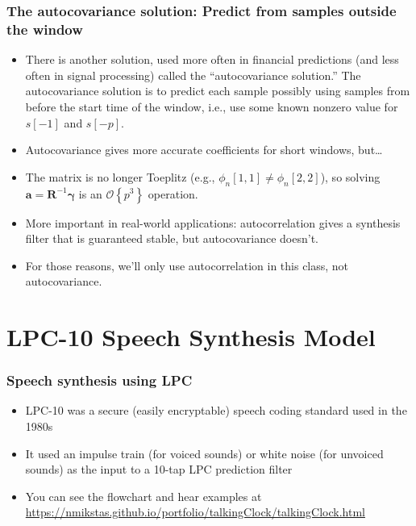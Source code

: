 \documentclass{beamer}
\begin{document}
\begin{frame}
  \frametitle{The autocovariance solution: Predict from samples outside the window}

  \begin{itemize}
  \item  There is another solution, used more often in financial predictions (and less
    often in signal processing) called the ``autocovariance solution.'' 
    The autocovariance solution is to predict each sample possibly using
    samples from before the start time of the window, i.e., use some
    known nonzero value for $s[-1]$ and $s[-p]$.
  \item Autocovariance gives more accurate coefficients for short windows, but\ldots
  \item The matrix is no longer Toeplitz (e.g.,
    $\phi_n[1,1]\ne\phi_n[2,2]$), so solving
    $\mathbf{a}=\mathbf{R}^{-1}\boldsymbol{\gamma}$ is an
    $\mathcal{O}\left\{p^3\right\}$ operation.
  \item More important in real-world applications: autocorrelation
    gives a synthesis filter that is guaranteed stable, but autocovariance doesn't.
  \item For those reasons, we'll only use autocorrelation in this
    class, not autocovariance.
  \end{itemize}
\end{frame}


\section{LPC-10 Speech Synthesis Model}


\begin{frame}
  \frametitle{Speech synthesis using LPC}

  \begin{itemize}
  \item LPC-10 was a secure (easily encryptable) speech coding standard used in the 1980s
  \item It used an impulse train (for voiced sounds) or white noise
    (for unvoiced sounds) as the input to a 10-tap LPC prediction filter
  \item You can see the flowchart and hear examples at \url{https://nmikstas.github.io/portfolio/talkingClock/talkingClock.html}
  \end{itemize}
\end{frame}
\end{document}
